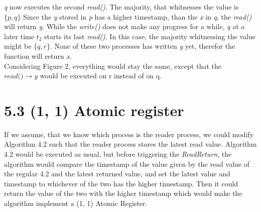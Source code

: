 \documentclass{article}
\begin{document}
\begin{enumerate}[a)]
        \textit{q} now executes the second \textit{read()}. The majority, that whitnesses the value is $\{ p, q \}$
        Since the \textit{y} stored in \textit{p} has a higher timestamp, than the \textit{x} in \textit{q}, the \textit{read()} will return \textit{y}.
        While the \textit{write()} does not make any progress for a while, \textit{q} at a later time $\textit{t}_2$ starts its last \textit{read()}.
        In this case, the majority whitnessing the value might be $\{q, r\}$.
        None of these two processes has written \textit{y} yet, therefor the function will return \textit{x}.\\
        Considering Figure 2, everything would stay the same, except that the $\textit{read()}\rightarrow y$ would be executed on r instead of on q.
    \end{enumerate}

      \section*{5.3 (1, 1) Atomic register}
   If we assume, that we know which process is the reader process, we could modify Algorithm 4.2 such that the reader process stores the latest read value.
   Algorithm 4.2 would be executed as usual, but before triggering the \textit{ReadReturn}, the algorithm would compare the timestamp of the value given by the read value of the regular 4.2 and the latest returned value, and set the latest value and timestamp to whichever of the two has the higher timestamp. Then it could return the value of the two with the higher timestamp which would make the algorithm implement a (1, 1) Atomic Register.
\end{document}
